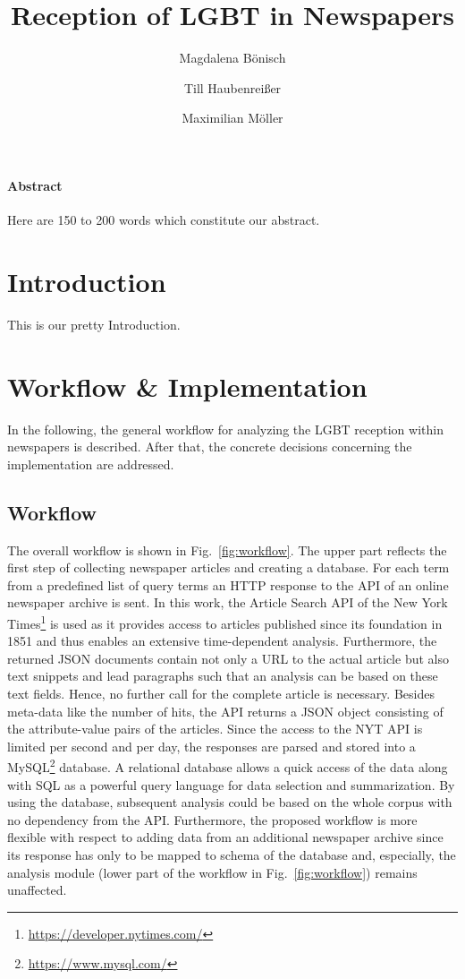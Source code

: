 \documentclass[10pt,a4paper,twocolumn]{scrartcl}
\title{Reception of LGBT in Newspapers}
\author{Magdalena Bönisch \and Till Haubenreißer \and Maximilian Möller}
\begin{document}
\onehalfspacing

\maketitle

{\footnotesize
\paragraph*{Abstract} Here are 150 to 200 words which constitute our abstract.
}


\section{Introduction}
This is our pretty Introduction.

\section{Workflow \& Implementation}
In the following, the general workflow for analyzing the LGBT reception within newspapers is described. After that, the concrete decisions concerning the implementation are addressed.

\subsection*{Workflow} The overall workflow is shown in Fig.~\ref{fig:workflow}. The upper part reflects the first step of collecting newspaper articles and creating a database. For each term from a predefined list of query terms an HTTP response to the API of an online newspaper archive is sent. In this work, the Article Search API of the New York Times\footnote{\url{https://developer.nytimes.com/}} is used as it provides access to articles published since its foundation in 1851 and thus enables an extensive time-dependent analysis. Furthermore, the returned JSON documents contain not only a URL to the actual article but also text snippets and lead paragraphs such that an analysis can be based on these text fields. Hence, no further call for the complete article is necessary. Besides meta-data like the number of hits, the API returns a JSON object consisting of the attribute-value pairs of the articles. Since the access to the NYT API is limited per second and per day, the responses are parsed and stored into a MySQL\footnote{\url{https://www.mysql.com/}} database. A relational database allows a quick access of the data along with SQL as a powerful query language for data selection and summarization. By using the database, subsequent analysis could be based on the whole corpus with no dependency from the API. Furthermore, the proposed workflow is more flexible with respect to adding data from an additional newspaper archive since its response has only to be mapped to schema of the database and, especially, the analysis module (lower part of the workflow in Fig.~\ref{fig:workflow}) remains unaffected.
\end{document}
